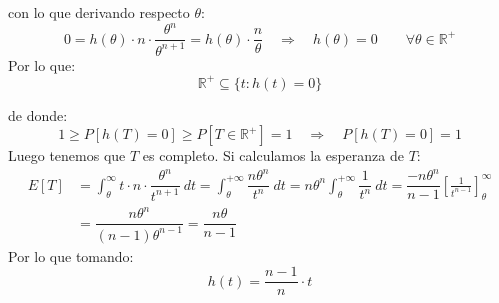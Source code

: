 \begin{ejercicio}
    con lo que derivando respecto $\theta$:
    \begin{equation*}
        0 = h(\theta) \cdot n \cdot \dfrac{\theta^n}{\theta^{n+1}} = h(\theta)\cdot \dfrac{n}{\theta} \quad \Longrightarrow \quad  h(\theta) = 0 \qquad \forall \theta\in \mathbb{R}^+
    \end{equation*}
    Por lo que:
    \begin{equation*}
        \mathbb{R}^+ \subseteq \{t:h(t) = 0\}
    \end{equation*}

    de donde:
    \begin{equation*}
        1 \geq P[h(T) = 0] \geq P[T\in \mathbb{R}^+] = 1 \quad \Longrightarrow \quad P[h(T)=0] = 1
    \end{equation*}
    Luego tenemos que $T$ es completo. Si calculamos la esperanza de $T$:
    \begin{align*}
        E[T] &= \int_{\theta}^{\infty} t\cdot n\cdot \dfrac{\theta^n}{t^{n+1}}~dt  = \int_{\theta}^{+\infty} \dfrac{n\theta^n}{t^n}~dt  = n\theta^n \int_{\theta}^{+\infty} \dfrac{1}{t^n}~dt  = \dfrac{-n\theta^n}{n-1} \left[\frac{1}{t^{n-1}}\right]_\theta^\infty \\
             &= \dfrac{n\theta^n}{(n-1)\theta^{n-1}} = \dfrac{n\theta}{n-1}
    \end{align*}
    Por lo que tomando:
    \begin{equation*}
        h(t) = \dfrac{n-1}{n}\cdot t
    \end{equation*}


\end{ejercicio}

